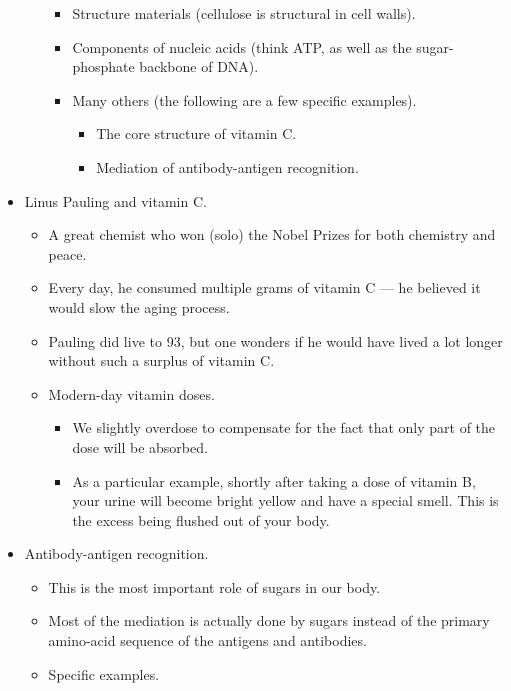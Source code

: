 \documentclass[../notes.tex]{subfiles}
\begin{document}
\begin{itemize}
\begin{enumerate}
\begin{itemize}
            \item Structure materials (cellulose is structural in cell walls).
            \item Components of nucleic acids (think ATP, as well as the sugar-phosphate backbone of DNA).
            \item Many others (the following are a few specific examples).
            \begin{itemize}
                \item The core structure of vitamin C.
                \item Mediation of antibody-antigen recognition.
            \end{itemize}
        \end{itemize}
    \end{enumerate}
    \item Linus Pauling and vitamin C.
    \begin{itemize}
        \item A great chemist who won (solo) the Nobel Prizes for both chemistry and peace.
        \item Every day, he consumed multiple grams of vitamin C --- he believed it would slow the aging process.
        \item Pauling did live to 93, but one wonders if he would have lived a lot longer without such a surplus of vitamin C.
        \item Modern-day vitamin doses.
        \begin{itemize}
            \item We slightly overdose to compensate for the fact that only part of the dose will be absorbed.
            \item As a particular example, shortly after taking a dose of vitamin B, your urine will become bright yellow and have a special smell. This is the excess being flushed out of your body.
        \end{itemize}
    \end{itemize}
    \item Antibody-antigen recognition.
    \begin{itemize}
        \item This is the most important role of sugars in our body.
        \item Most of the mediation is actually done by sugars instead of the primary amino-acid sequence of the antigens and antibodies.
        \item Specific examples.
        \begin{itemize}

\end{itemize}
\end{itemize}
\end{itemize}
\end{document}
